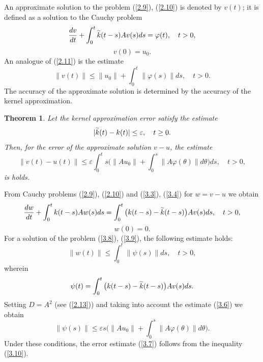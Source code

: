 \documentclass[3p]{elsarticle}
\newtheorem{thm}{Theorem}
\numberwithin{equation}{section}
\begin{document}
An approximate solution to the problem (\ref{2.9}), (\ref{2.10}) is denoted by $v(t)$; it is defined as a solution to the Cauchy problem
\begin{equation}\label{3.3}
 \frac{d v}{d t} + \int_{0}^{t} \accentset{\sim }{k}(t-s)  A v(s) d s = \varphi (t),
 \quad t > 0 ,  
\end{equation} 
\begin{equation}\label{3.4}
 v(0) = u_0 .
\end{equation} 
An analogue of (\ref{2.11}) is the estimate
\begin{equation}\label{3.5}
 \|v(t)\| \leq \|u_0\| + \int_{0}^{t} \|\varphi(s)\| d s,
 \quad t > 0 . 
\end{equation} 
The accuracy of the approximate solution is determined by the accuracy of the kernel approximation.

\begin{thm}\label{t-2}
Let the kernel approximation error satisfy the estimate
\begin{equation}\label{3.6}
 |\accentset{\sim }{k}(t) - k(t)| \leq \varepsilon ,
 \quad t \geq 0 .  
\end{equation} 
Then, for the error of the approximate solution $v - u$, the estimate
\begin{equation}\label{3.7}
 \|v(t)-u(t)\| \leq \varepsilon \int_{0}^{t} s \Big ( \|Au_0\| + \int_{0}^{s} \|A \varphi (\theta) \| d \theta \Big ) d s,
 \quad t > 0 , 
\end{equation} 
is holds.
\end{thm}

\begin{pf}
From Cauchy problems (\ref{2.9}), (\ref{2.10}) and (\ref{3.3}), (\ref{3.4}) for $w = v-u$ we obtain
\begin{equation}\label{3.8}
 \frac{d w}{d t} + \int_{0}^{t} k(t-s)  A w(s) d s = 
 \int_{0}^{t} \big(k(t-s) - \accentset{\sim }{k}(t-s)\big)   A v(s) d s,
 \quad t > 0 ,  
\end{equation} 
\begin{equation}\label{3.9}
 w(0) = 0 .
\end{equation} 
For a solution of the problem (\ref{3.8}), (\ref{3.9}), the following estimate holds:
\begin{equation}\label{3.10}
 \|w(t)\| \leq \int_{0}^{t} \|\psi(s)\| d s,
 \quad t > 0 , 
\end{equation} 
wherein
\[
 \psi(t) = \int_{0}^{t} \big(k(t-s) - \accentset{\sim }{k}(t-s)\big)   A v(s) d s .
\] 
Setting  $D = A^2$ (see (\ref{2.13})) and taking into account the estimate (\ref{3.6}) we obtain
\[
 \|\psi(s)\| \leq \varepsilon s \Big ( \|Au_0\| + \int_{0}^{s} \|A \varphi (\theta) \| d \theta \Big ) .
\] 
Under these conditions, the error estimate (\ref{3.7}) follows from the inequality (\ref{3.10}).
\end{pf}
\end{document}
